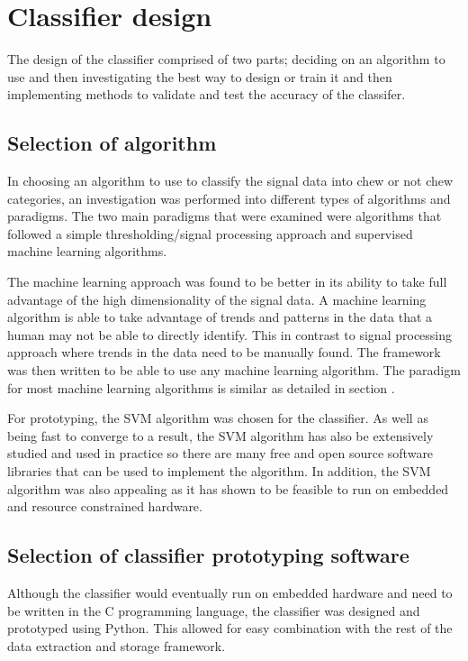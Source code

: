 \section{Classifier design}

The design of the classifier comprised of two parts; deciding on an algorithm to use and then investigating the best way to design or train it and then implementing methods to validate and test the accuracy of the classifer.  

\subsection{Selection of algorithm}

In choosing an algorithm to use to classify the signal data into chew or not chew categories, an investigation was performed into different types of algorithms and paradigms. The two main paradigms that were examined were algorithms that followed a simple thresholding/signal processing approach and supervised machine learning algorithms. 

The machine learning approach was found to be better in its ability to take full advantage of the high dimensionality of the signal data. A machine learning algorithm is able to take advantage of trends and patterns in the data that a human may not be able to directly identify. This in contrast to signal processing approach where trends in the data need to be manually found. The framework was then written to be able to use any machine learning algorithm. The paradigm for most machine learning algorithms is similar as detailed in section \label{classifierframework}.

For prototyping, the SVM algorithm was chosen for the classifier. As well as being fast to converge to a result, the SVM algorithm has also be extensively studied and used in practice so there are many free and open source software libraries that can be used to implement the algorithm. In addition, the SVM algorithm was also appealing as it has shown to be feasible to run on embedded and resource constrained hardware. 

\subsection{Selection of classifier prototyping software}

Although the classifier would eventually run on embedded hardware and need to be written in the C programming language, the classifier was designed and prototyped using Python. This allowed for easy combination with the rest of the data extraction and storage framework. 

